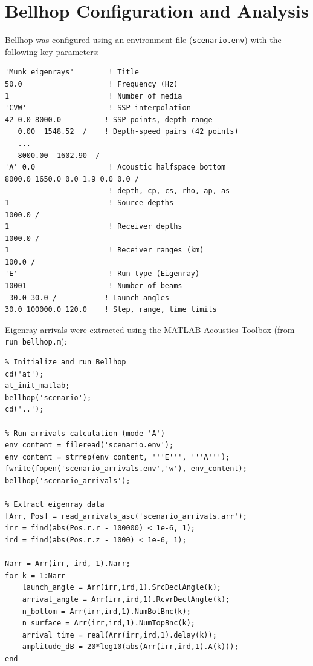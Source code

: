 \documentclass[fleqn]{jaes}
\begin{document}
\section{Bellhop Configuration and Analysis}

Bellhop was configured using an environment file (\texttt{scenario.env}) with the following key parameters:

\begin{verbatim}
'Munk eigenrays'        ! Title
50.0                    ! Frequency (Hz)
1                       ! Number of media
'CVW'                   ! SSP interpolation
42 0.0 8000.0          ! SSP points, depth range
   0.00  1548.52  /    ! Depth-speed pairs (42 points)
   ...
   8000.00  1602.90  /
'A' 0.0                 ! Acoustic halfspace bottom
8000.0 1650.0 0.0 1.9 0.0 0.0 /
                        ! depth, cp, cs, rho, ap, as
1                       ! Source depths
1000.0 /
1                       ! Receiver depths
1000.0 /
1                       ! Receiver ranges (km)
100.0 /
'E'                     ! Run type (Eigenray)
10001                   ! Number of beams
-30.0 30.0 /           ! Launch angles
30.0 100000.0 120.0    ! Step, range, time limits
\end{verbatim}

Eigenray arrivals were extracted using the MATLAB Acoustics Toolbox (from \texttt{run\_bellhop.m}):

\begin{verbatim}
% Initialize and run Bellhop
cd('at');
at_init_matlab;
bellhop('scenario');
cd('..');

% Run arrivals calculation (mode 'A')
env_content = fileread('scenario.env');
env_content = strrep(env_content, '''E''', '''A''');
fwrite(fopen('scenario_arrivals.env','w'), env_content);
bellhop('scenario_arrivals');

% Extract eigenray data
[Arr, Pos] = read_arrivals_asc('scenario_arrivals.arr');
irr = find(abs(Pos.r.r - 100000) < 1e-6, 1);
ird = find(abs(Pos.r.z - 1000) < 1e-6, 1);

Narr = Arr(irr, ird, 1).Narr;
for k = 1:Narr
    launch_angle = Arr(irr,ird,1).SrcDeclAngle(k);
    arrival_angle = Arr(irr,ird,1).RcvrDeclAngle(k);
    n_bottom = Arr(irr,ird,1).NumBotBnc(k);
    n_surface = Arr(irr,ird,1).NumTopBnc(k);
    arrival_time = real(Arr(irr,ird,1).delay(k));
    amplitude_dB = 20*log10(abs(Arr(irr,ird,1).A(k)));
end
\end{verbatim}
\end{document}
